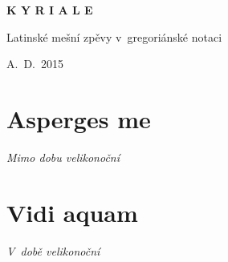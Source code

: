 \documentclass[12pt]{article} %
\newcommand{\info}[2]{{\textsc{#1}\hfill{\em #2}}\par\vspace{1em}}
\begin{document}
\begin{titlepage}
  \begin{center}

    { \vspace*{60 mm} }
    \begin{Huge}\textbf{K Y R I A L E}\end{Huge}

    \vspace{30 mm}
    \begin{Large}{Latinské mešní zpěvy v~gregoriánské notaci}\end{Large}

    \vspace{110 mm}
    \begin{large}{A.~D.~2015}\end{large}

  \end{center}
\end{titlepage}


\newpage
\thispagestyle{empty}
\mbox{}
\setcounter{page}{0}





\def\greinitialformat#1{{\fontsize{43}{43}\selectfont #1}}

\redlines





\newpage

\section{Asperges me}
\info{}{Mimo dobu velikonoční}




\section{Vidi aquam}
\info{}{V~době velikonoční}
\end{document}
